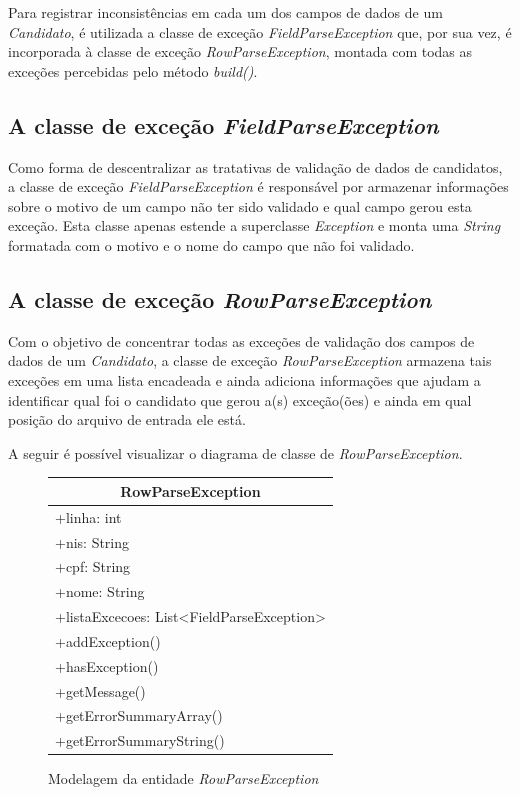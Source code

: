 \documentclass[
	12pt,			%
	openright,		%
	oneside,	
	a4paper,		%
	english,		%
	brazil			%
]{abntex2/abntex2}  %
\begin{document}
	Para registrar inconsistências em cada um dos campos de dados de um \textit{Candidato}, é utilizada a classe de exceção \textit{FieldParseException} que, por sua vez, é incorporada à classe de exceção \textit{RowParseException}, montada com todas as exceções percebidas pelo método \textit{build()}.

	\subsection{A classe de exceção \textit{FieldParseException}}
	
	Como forma de descentralizar as tratativas de validação de dados de candidatos, a classe de exceção \textit{FieldParseException} é responsável por armazenar informações sobre o motivo de um campo não ter sido validado e qual campo gerou esta exceção. Esta classe apenas estende a superclasse \textit{Exception} e monta uma \textit{String} formatada com o motivo e o nome do campo que não foi validado.

	\subsection{A classe de exceção \textit{RowParseException}}	

	Com o objetivo de concentrar todas as exceções de validação dos campos de dados de um \textit{Candidato}, a classe de exceção \textit{RowParseException} armazena tais exceções em uma lista encadeada e ainda adiciona informações que ajudam a identificar qual foi o candidato que gerou a(s) exceção(ões) e ainda em qual posição do arquivo de entrada ele está.
	
	A seguir é possível visualizar o diagrama de classe de \textit{RowParseException}.
	
	\begin{figure}[H]
		\begin{center}
			
			\caption{Modelagem da entidade \textit{RowParseException}}
			\label{rowparseexception-uml}

			\begin{tabular}{|l|}
				\hline
				\multicolumn{1}{|c|}{\textbf{RowParseException}} \\ \hline
				+linha: int \\
				+nis: String \\
				+cpf: String \\
				+nome: String \\
				+listaExcecoes: List\textless{}FieldParseException\textgreater{} \\ \hline
				+addException() \\
				+hasException() \\
				+getMessage() \\
				+getErrorSummaryArray() \\
				+getErrorSummaryString() \\ \hline
			\end{tabular}
			
		\end{center}
	\end{figure}
\end{document}
